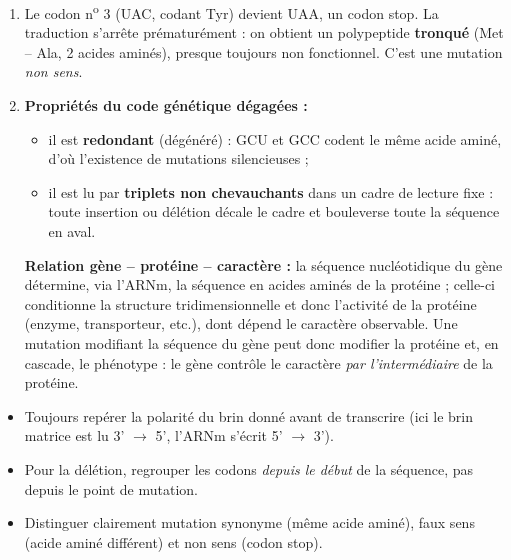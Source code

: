 \documentclass[11pt]{article}
\newcommand{\cle}[1]{{\popxbold\color{popdark}#1}}
\begin{document}
\begin{corrige}
\begin{enumerate}
\item Le codon n\textsuperscript{o} 3 (UAC, codant Tyr) devient UAA, un \cle{codon stop}. La traduction s'arrête prématurément : on obtient un polypeptide \textbf{tronqué} (Met -- Ala, 2 acides aminés), presque toujours non fonctionnel. C'est une mutation \emph{non sens}.
\item \textbf{Propriétés du code génétique dégagées :}
\begin{itemize}
\item il est \textbf{redondant} (dégénéré) : GCU et GCC codent le même acide aminé, d'où l'existence de mutations silencieuses ;
\item il est lu par \textbf{triplets non chevauchants} dans un cadre de lecture fixe : toute insertion ou délétion décale le cadre et bouleverse toute la séquence en aval.
\end{itemize}
\textbf{Relation gène -- protéine -- caractère :} la séquence nucléotidique du gène détermine, via l'ARNm, la séquence en acides aminés de la protéine ; celle-ci conditionne la structure tridimensionnelle et donc l'activité de la protéine (enzyme, transporteur, etc.), dont dépend le caractère observable. Une mutation modifiant la séquence du gène peut donc modifier la protéine et, en cascade, le phénotype : le gène contrôle le caractère \emph{par l'intermédiaire} de la protéine.
\end{enumerate}
\begin{attention}
\begin{itemize}
\item Toujours repérer la polarité du brin donné avant de transcrire (ici le brin matrice est lu 3' $\rightarrow$ 5', l'ARNm s'écrit 5' $\rightarrow$ 3').
\item Pour la délétion, regrouper les codons \emph{depuis le début} de la séquence, pas depuis le point de mutation.
\item Distinguer clairement mutation synonyme (même acide aminé), faux sens (acide aminé différent) et non sens (codon stop).
\end{itemize}
\end{attention}
\end{corrige}
\end{document}

